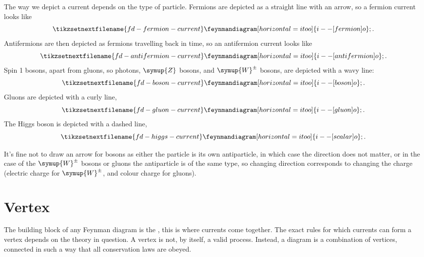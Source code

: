 \documentclass[fleqn]{NotesClass}
\newcommand{\Pparticle}[1]{\symup{#1}}
\newcommand{\PZ}{\ensuremath{\Pparticle{Z}}}
\newcommand{\PWpm}{\ensuremath{\Pparticle{W}^{\pm}}}
\begin{document}
    The way we depict a current depends on the type of particle.
    Fermions are depicted as a straight line with an arrow, so a fermion current looks like
    \begin{equation}
        \tikzsetnextfilename{fd-fermion-current}
        \feynmandiagram [horizontal=i to o] {
            i -- [fermion] o
        };
        .
    \end{equation}
    Antifermions are then depicted as fermions travelling back in time, so an antifermion current looks like
    \begin{equation}
        \tikzsetnextfilename{fd-antifermion-current}
        \feynmandiagram [horizontal=i to o] {
            i -- [anti fermion] o
        };
        .
    \end{equation}
    Spin 1 bosons, apart from gluons, so photons, \PZ{} bosons, and \PWpm{} bosons, are depicted with a wavy line:
    \begin{equation}
        \tikzsetnextfilename{fd-boson-current}
        \feynmandiagram [horizontal=i to o] {
            i -- [boson] o
        };
        .
    \end{equation}
    Gluons are depicted with a curly line,
    \begin{equation}
        \tikzsetnextfilename{fd-gluon-current}
        \feynmandiagram [horizontal=i to o] {
            i -- [gluon] o
        };
        .
    \end{equation}
    The Higgs boson is depicted with a dashed line,
    \begin{equation}
        \tikzsetnextfilename{fd-higgs-current}
        \feynmandiagram [horizontal=i to o] {
            i -- [scalar] o
        };
        .
    \end{equation}
    
    It's fine not to draw an arrow for bosons as either the particle is its own antiparticle, in which case the direction does not matter, or in the case of the \PWpm{} bosons or gluons the antiparticle is of the same type, so changing direction corresponds to changing the charge (electric charge for \PWpm, and colour charge for gluons).
    
    \section{Vertex}
    The building block of any Feynman diagram is the , this is where currents come together.
    The exact rules for which currents can form a vertex depends on the theory in question.
    A vertex is not, by itself, a valid process.
    Instead, a diagram is a combination of vertices, connected in such a way that all conservation laws are obeyed.
    
\end{document}
